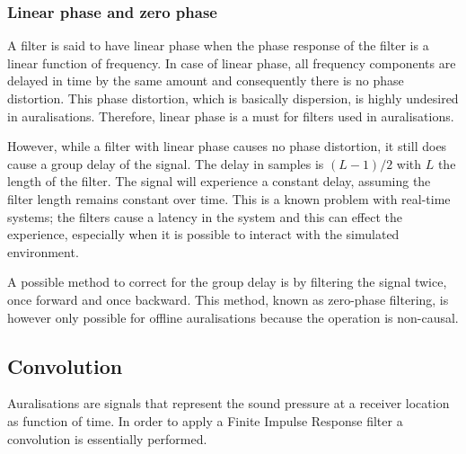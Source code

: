 \subsubsection{Linear phase and zero phase}\label{sec:theory:signal-processing:linear-phase}
A filter is said to have linear phase when the phase response of the filter is a 
linear function of frequency. In case of linear phase, all frequency components 
are delayed in time by the same amount and consequently there is no phase 
distortion. This phase distortion, which is basically dispersion, is highly 
undesired in auralisations. Therefore, linear phase is a must for filters used 
in auralisations.

However, while a filter with linear phase causes no phase distortion, it still
does cause a group delay of the signal. The delay in samples is $(L-1)/2$ with
$L$ the length of the filter. The signal will experience a constant delay,
assuming the filter length remains constant over time. This is a known problem
with real-time systems; the filters cause a latency in the system and this can
effect the experience, especially when it is possible to interact with the
simulated environment.

A possible method to correct for the group delay is by filtering the signal 
twice, once forward and once backward. This method, known as zero-phase 
filtering, is however only possible for offline auralisations because the 
operation is non-causal.






\subsection{Convolution}\label{sec:theory:signal:convolution}
Auralisations are signals that represent the sound pressure at a receiver location as function of time.
In order to apply a Finite Impulse Response filter a convolution is essentially performed.

